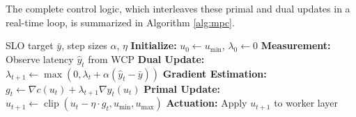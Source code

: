 \documentclass[journal]{IEEEtran}
\begin{document}
The complete control logic, which interleaves these primal and dual updates in a real-time loop, is summarized in Algorithm \ref{alg:mpc}.

\begin{algorithm}[!htbp]  
  \caption{Online Primal-Dual MPC}
  \label{alg:mpc}
  \begin{algorithmic}[1]
    \Require SLO target $\bar{y}$, step sizes $\alpha$, $\eta$
    \State \textbf{Initialize:} $u_0 \leftarrow u_{\min}$, $\lambda_0 \leftarrow 0$
      \State \textbf{Measurement:} Observe latency $\hat{y}_t$ from WCP
      \State \textbf{Dual Update:}
      \State \quad $\lambda_{t+1} \leftarrow \max(0, \lambda_t + \alpha (\hat{y}_t - \bar{y}))$
      \State \textbf{Gradient Estimation:}
      \State \quad $g_t \leftarrow \nabla c(u_t) + \lambda_{t+1} \nabla \hat{y}_t(u_t)$
      \State \textbf{Primal Update:}
      \State \quad $u_{t+1} \leftarrow \operatorname{clip}\left(u_t - \eta \cdot g_t, u_{\min}, u_{\max}\right)$
      \State \textbf{Actuation:} Apply $u_{t+1}$ to worker layer
    \EndFor
  \end{algorithmic}
\end{algorithm}
\end{document}
